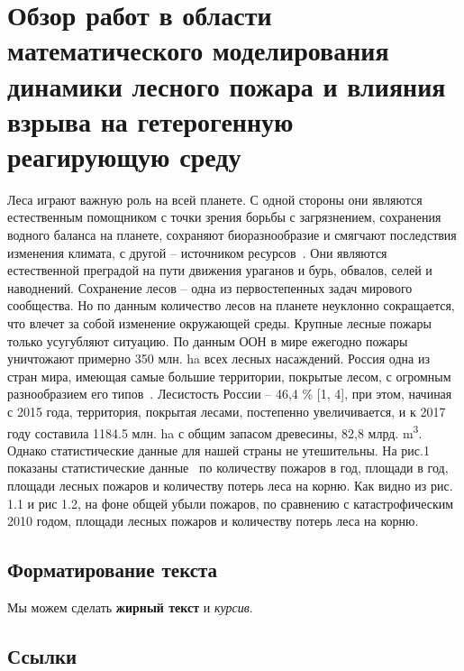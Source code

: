 \chapter{Обзор работ в области математического моделирования динамики лесного пожара и влияния взрыва на
гетерогенную реагирующую среду}\label{ch:ch1}

Леса играют важную роль на всей планете.
С одной стороны они являются естественным помощником с точки зрения борьбы с
загрязнением, сохранения водного баланса на планете, сохраняют биоразнообразие и
смягчают последствия изменения климата, с другой -- источником ресурсов~\cite{gks_environmental_protection, ecology_now, ria_the_largest_fires_in_russia, federal_forest_agency, food2018state}.
Они являются естественной преградой на пути движения ураганов и бурь, обвалов,
селей и наводнений.
Сохранение лесов -- одна из первостепенных задач мирового сообщества.
Но по данным \cite{food2018state, nifc_total_wildland_fires_and_acres} количество лесов на планете неуклонно сокращается,
что влечет за собой изменение окружающей среды.
Крупные лесные пожары только усугубляют ситуацию.
По данным ООН в мире ежегодно пожары уничтожают примерно \num{350} млн. \si{\hectare} всех лесных насаждений.
Россия одна из стран мира, имеющая самые большие территории, покрытые лесом, с огромным разнообразием его типов~\cite{gks_environmental_protection}.
Лесистость России -- 46,4 \% [1, 4], при этом, начиная с 2015 года, территория,
покрытая лесами, постепенно увеличивается, и к 2017 году составила \num{1184,5} млн. \si{\hectare} с общим запасом
древесины, 82,8 млрд. \si{\metre^3}.
Однако статистические данные для нашей страны не утешительны.
На рис.1 показаны статистические данные~\cite{gks_environmental_protection} по количеству пожаров в год, площади в год,
площади лесных пожаров и количеству потерь леса на корню.
Как видно из рис. 1.1 и рис 1.2, на фоне общей убыли пожаров, по сравнению с катастрофическим 2010
годом, площади лесных пожаров и количеству потерь леса на корню.


\section{Форматирование текста}\label{sec:ch1/sec1}

Мы можем сделать \textbf{жирный текст} и \textit{курсив}.


\section{Ссылки}\label{sec:ch1/sec2}

